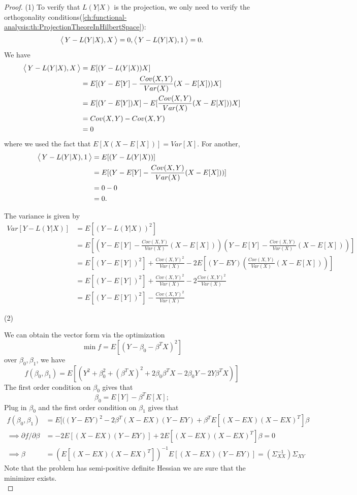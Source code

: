 \begin{refsection}
\begin{theorem}
\begin{itemize}
\end{itemize}	
\end{theorem}
\begin{proof}
(1)
To verify that $L(Y|X)$ is the projection, we only need to verify the orthogonality conditions(\autoref{ch:functional-analysis:th:ProjectionTheoreInHilbertSpace}):
$${\left< \, Y-L(Y|X),X \, \right>} = 0, {\left< \, Y-L(Y|X),1 \, \right>}= 0.$$
We have
\begin{align*}
{\left< \, Y-L(Y|X),X \, \right>} &= E[(Y-L(Y|X))X] \\
&=E[(Y - E[Y] - \frac{Cov(X,Y)}{Var(X)}(X-E[X]))X] \\
&=E[(Y - E[Y])X] -  E[\frac{Cov(X,Y)}{Var(X)}(X-E[X]))X] \\
&=Cov(X,Y) - Cov(X,Y) \\
&=0 
\end{align*}
where we used the fact that $E[X(X-E[X])] = Var[X]$.
For another, 
\begin{align*}
{\left< \, Y-L(Y|X),1 \, \right>} &= E[(Y-L(Y|X))] \\
&=E[(Y - E[Y] - \frac{Cov(X,Y)}{Var(X)}(X-E[X]))] \\
&=0 - 0 \\
&=0.
\end{align*}

The variance is given by
\begin{align*}
Var[Y-L(Y|X)] &= E[(Y-L(Y|X))^2] \\
& = E[(Y - E[Y] - \frac{Cov(X,Y)}{Var(X)}(X-E[X]))(Y - E[Y] - \frac{Cov(X,Y)}{Var(X)}(X-E[X]))] \\
& = E[(Y - E[Y])^2] + \frac{Cov(X,Y)^2}{Var(X)} - 2E[(Y-EY)(\frac{Cov(X,Y)}{Var(X)}(X-E[X]))] \\
& = E[(Y - E[Y])^2] + \frac{Cov(X,Y)^2}{Var(X)} - 2\frac{Cov(X,Y)^2}{Var(X)} \\
& = E[(Y - E[Y])^2] - \frac{Cov(X,Y)^2}{Var(X)} 
\end{align*}

(2)

We can obtain the vector form via the optimization
$$\min f = E[(Y - \beta_0 - \beta^TX)^2]$$
over $\beta_0, \beta_1$, we have 
$$f(\beta_0,\beta_1) = E[(Y^2 + \beta_0^2 + (\beta^TX)^2+ 2\beta_0\beta^TX - 2\beta_0Y - 2Y\beta^TX)]$$
The first order condition on $\beta_0$ gives that
$$\beta_0 = E[Y] - \beta^TE[X];$$
Plug in $\beta_0$ 
and the first order condition on $\beta_1$ gives that
\begin{align*}
f(\beta_0,\beta_1) &= E[((Y - EY)^2 - 2\beta^T(X-EX)(Y-EY) + \beta^TE[(X-EX)(X-EX)^T]\beta \\
\implies \partial f/\partial \beta &= -2E[(X-EX)(Y-EY)] + 2 E[(X-EX)(X-EX)^T]\beta  = 0 \\
\implies \beta &= (E[(X-EX)(X-EX)^T])^{-1}E[(X-EX)(Y-EY)] = (\Sigma_{XX}^{-1})\Sigma_{XY}
\end{align*}
Note that the problem has semi-positive definite Hessian we are sure that the minimizer exists. \\


\end{proof}
\end{refsection}
